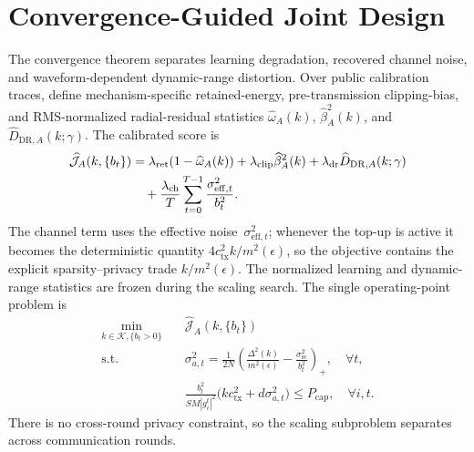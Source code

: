 \documentclass[journal]{IEEEtran}
\newenvironment{revisionblock}{\begingroup\color{revisionred}}{\endgroup}
\begin{document}
\begin{revisionblock}
\section{Convergence-Guided Joint Design}
\label{sec:joint_optimization}
The convergence theorem separates learning degradation, recovered channel noise, and waveform-dependent dynamic-range distortion. Over public calibration traces, define mechanism-specific retained-energy, pre-transmission clipping-bias, and RMS-normalized radial-residual statistics $\widehat\omega_A(k)$, $\widehat\beta_A^2(k)$, and $\widehat D_{\mathrm{DR},A}(k;\gamma)$. The calibrated score is
\begin{align}
 \widehat{\mathcal J}_A(k,\{b_t\})
 &=\lambda_{\mathrm{ret}}(1-\widehat\omega_A(k))
 +\lambda_{\mathrm{clip}}\widehat\beta_A^2(k)
 +\lambda_{\mathrm{dr}}\widehat D_{\mathrm{DR},A}(k;\gamma)\notag\\
 &\quad+\frac{\lambda_{\mathrm{ch}}}{T}\sum_{t=0}^{T-1}\frac{\sigma_{\mathrm{eff},t}^2}{b_t^2}.
 \label{eqn:calibrated_score}
\end{align}
The channel term uses the effective noise~$\sigma_{\mathrm{eff},t}^2$; whenever the top-up is active it becomes the deterministic quantity $4c_{\mathrm{tx}}^2k/m^2(\epsilon)$, so the objective contains the explicit sparsity--privacy trade $k/m^2(\epsilon)$. The normalized learning and dynamic-range statistics are frozen during the scaling search. The single operating-point problem is
\begin{align}
 \min_{k\in\mathcal K,\{b_t>0\}}\quad &\widehat{\mathcal J}_A(k,\{b_t\})\label{eqn:unified_design}\\
 \mathrm{s.t.}\quad &\sigma_{a,t}^2=\frac{1}{2N}\left(\frac{\Delta^2(k)}{m^2(\epsilon)}-\frac{\sigma_{\mathrm{sc}}^2}{b_t^2}\right)_+,\quad \forall t,\nonumber\\
 &\frac{b_t^2}{SM|g_i^t|^2}\big(kc_{\mathrm{tx}}^2+d\sigma_{a,t}^2\big)\le P_{\mathrm{cap}},\quad \forall i,t.\nonumber
\end{align}
There is no cross-round privacy constraint, so the scaling subproblem separates across communication rounds.


\end{revisionblock}
\end{document}
